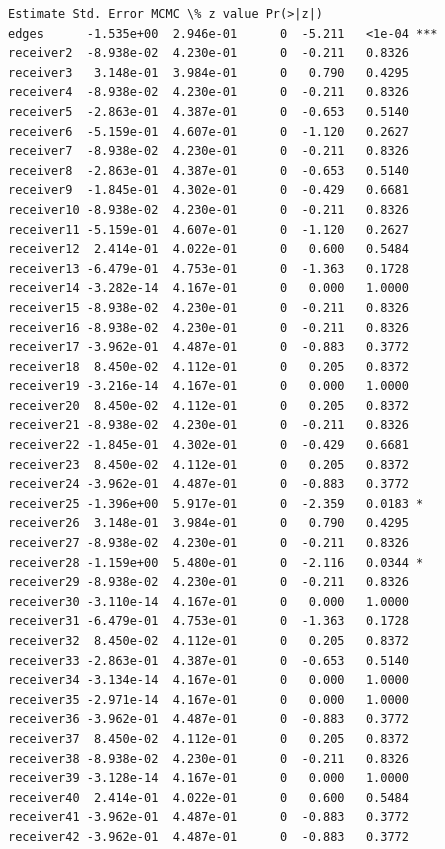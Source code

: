 \documentclass[11pt]{article}
\begin{document}
\begin{Verbatim}[commandchars=\\\{\}]
             Estimate Std. Error MCMC \% z value Pr(>|z|)    
edges      -1.535e+00  2.946e-01      0  -5.211   <1e-04 ***
receiver2  -8.938e-02  4.230e-01      0  -0.211   0.8326    
receiver3   3.148e-01  3.984e-01      0   0.790   0.4295    
receiver4  -8.938e-02  4.230e-01      0  -0.211   0.8326    
receiver5  -2.863e-01  4.387e-01      0  -0.653   0.5140    
receiver6  -5.159e-01  4.607e-01      0  -1.120   0.2627    
receiver7  -8.938e-02  4.230e-01      0  -0.211   0.8326    
receiver8  -2.863e-01  4.387e-01      0  -0.653   0.5140    
receiver9  -1.845e-01  4.302e-01      0  -0.429   0.6681    
receiver10 -8.938e-02  4.230e-01      0  -0.211   0.8326    
receiver11 -5.159e-01  4.607e-01      0  -1.120   0.2627    
receiver12  2.414e-01  4.022e-01      0   0.600   0.5484    
receiver13 -6.479e-01  4.753e-01      0  -1.363   0.1728    
receiver14 -3.282e-14  4.167e-01      0   0.000   1.0000    
receiver15 -8.938e-02  4.230e-01      0  -0.211   0.8326    
receiver16 -8.938e-02  4.230e-01      0  -0.211   0.8326    
receiver17 -3.962e-01  4.487e-01      0  -0.883   0.3772    
receiver18  8.450e-02  4.112e-01      0   0.205   0.8372    
receiver19 -3.216e-14  4.167e-01      0   0.000   1.0000    
receiver20  8.450e-02  4.112e-01      0   0.205   0.8372    
receiver21 -8.938e-02  4.230e-01      0  -0.211   0.8326    
receiver22 -1.845e-01  4.302e-01      0  -0.429   0.6681    
receiver23  8.450e-02  4.112e-01      0   0.205   0.8372    
receiver24 -3.962e-01  4.487e-01      0  -0.883   0.3772    
receiver25 -1.396e+00  5.917e-01      0  -2.359   0.0183 *  
receiver26  3.148e-01  3.984e-01      0   0.790   0.4295    
receiver27 -8.938e-02  4.230e-01      0  -0.211   0.8326    
receiver28 -1.159e+00  5.480e-01      0  -2.116   0.0344 *  
receiver29 -8.938e-02  4.230e-01      0  -0.211   0.8326    
receiver30 -3.110e-14  4.167e-01      0   0.000   1.0000    
receiver31 -6.479e-01  4.753e-01      0  -1.363   0.1728    
receiver32  8.450e-02  4.112e-01      0   0.205   0.8372    
receiver33 -2.863e-01  4.387e-01      0  -0.653   0.5140    
receiver34 -3.134e-14  4.167e-01      0   0.000   1.0000    
receiver35 -2.971e-14  4.167e-01      0   0.000   1.0000    
receiver36 -3.962e-01  4.487e-01      0  -0.883   0.3772    
receiver37  8.450e-02  4.112e-01      0   0.205   0.8372    
receiver38 -8.938e-02  4.230e-01      0  -0.211   0.8326    
receiver39 -3.128e-14  4.167e-01      0   0.000   1.0000    
receiver40  2.414e-01  4.022e-01      0   0.600   0.5484    
receiver41 -3.962e-01  4.487e-01      0  -0.883   0.3772    
receiver42 -3.962e-01  4.487e-01      0  -0.883   0.3772    

\end{Verbatim}
\end{document}
